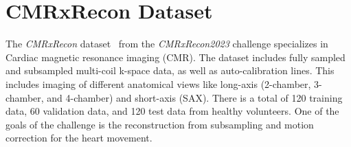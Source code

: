 \documentclass[english,version-2022-01]{uzl-thesis} %
\begin{document}
%

\section{CMRxRecon Dataset} \label{Sec:CMRxRecon}
The \emph{CMRxRecon} dataset~\cite{CMRxRecon} from the \emph{CMRxRecon2023} challenge specializes in Cardiac magnetic resonance imaging (CMR). The dataset includes 
fully sampled and subsampled multi-coil k-space data, as well as auto-calibration lines. This includes imaging of different anatomical views like long-axis (2-chamber, 3-chamber, and 4-chamber) and short-axis (SAX). There is a total of 120 training data, 60 validation data, and 120 test data from healthy volunteers. One of the goals of the challenge is the reconstruction from subsampling and motion correction for the heart movement.
\end{document}
